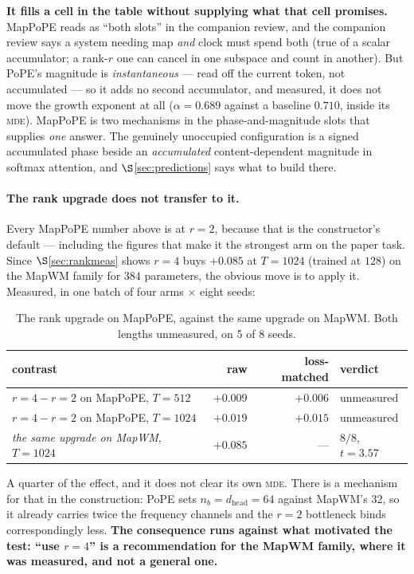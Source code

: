 \documentclass[11pt]{article}
\newcommand{\hd}{d_{\mathrm{head}}}
\newcommand{\nb}{n_b}
\begin{document}
\textbf{It fills a cell in the table without supplying what that cell promises.}
MapPoPE reads as ``both slots'' in the companion review, and the companion review
says a system needing map \emph{and} clock must spend both (true of a scalar
accumulator; a rank-$r$ one can cancel in one subspace and count in another). But PoPE's magnitude is
\emph{instantaneous} --- read off the current token, not accumulated --- so it adds
no second accumulator, and measured, it does not move the growth exponent at all
($\alpha = 0.689$ against a baseline $0.710$, inside its \textsc{mde}). MapPoPE is
two mechanisms in the phase-and-magnitude slots that supplies \emph{one} answer.
The genuinely unoccupied configuration is a signed accumulated phase beside an
\emph{accumulated} content-dependent magnitude in softmax attention, and
$\S$\ref{sec:predictions} says what to build there.

\paragraph{The rank upgrade does not transfer to it.} Every MapPoPE number above is
at $r=2$, because that is the constructor's default --- including the figures that
make it the strongest arm on the paper task. Since $\S$\ref{sec:rankmeas} shows $r=4$
buys $+0.085$ at $T=1024$ (trained at $128$) on the MapWM family for $384$ parameters,
the obvious move is to apply it. Measured, in one batch of four arms $\times$ eight seeds:

\begin{table}[htbp]\centering\small
\caption{The rank upgrade on MapPoPE, against the same upgrade on MapWM. Both lengths unmeasured, on 5 of 8 seeds.}
\label{tab:mappoper4}
\begin{tabular}{lrrl}
\toprule
contrast & raw & loss-matched & verdict \\
\midrule
$r{=}4 - r{=}2$ on MapPoPE, $T{=}512$ & $+0.009$ & $+0.006$ & unmeasured \\
$r{=}4 - r{=}2$ on MapPoPE, $T{=}1024$ & $+0.019$ & $+0.015$ & unmeasured \\
\emph{the same upgrade on MapWM}, $T{=}1024$ & $+0.085$ & --- & $8/8$, $t=3.57$ \\
\bottomrule
\end{tabular}
\end{table}

\noindent A quarter of the effect, and it does not clear its own \textsc{mde}. There
is a mechanism for that in the construction: PoPE sets $\nb = \hd = 64$ against
MapWM's $32$, so it already carries twice the frequency channels and the $r=2$
bottleneck binds correspondingly less. \textbf{The consequence runs against what
motivated the test: ``use $r=4$'' is a recommendation for the MapWM family, where it
was measured, and not a general one.}
\end{document}
